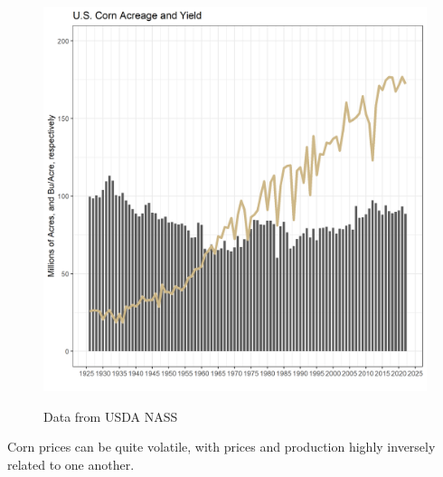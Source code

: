 \documentclass[
  letterpaper,
  DIV=11,
  numbers=noendperiod]{scrreprt}
\begin{document}
\begin{figure}

{\centering 

\href{https://quickstats.nass.usda.gov/}{\includegraphics{assets/PrimerforGrain_CornAcandY.png}}

}

\caption{Data from USDA NASS}

\end{figure}

Corn prices can be quite volatile, with prices and production highly
inversely related to one another.
\end{document}
